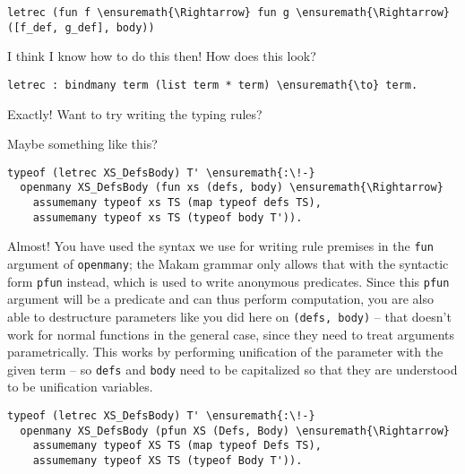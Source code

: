\begin{verbatim}
letrec (fun f \ensuremath{\Rightarrow} fun g \ensuremath{\Rightarrow} ([f_def, g_def], body))
\end{verbatim}

\heroSTUDENT{} I think I know how to do this then! How does this look?

\begin{verbatim}
letrec : bindmany term (list term * term) \ensuremath{\to} term.
\end{verbatim}

\heroADVISOR{} Exactly! Want to try writing the typing rules?

\heroSTUDENT{} Maybe something like this?

\begin{verbatim}
typeof (letrec XS_DefsBody) T' \ensuremath{:\!-}
  openmany XS_DefsBody (fun xs (defs, body) \ensuremath{\Rightarrow}
    assumemany typeof xs TS (map typeof defs TS),
    assumemany typeof xs TS (typeof body T')).
\end{verbatim}

\heroADVISOR{} Almost! You have used the syntax we use for writing rule
premises in the \texttt{fun} argument of \texttt{openmany}; the Makam
grammar only allows that with the syntactic form \texttt{pfun} instead,
which is used to write anonymous predicates. Since this \texttt{pfun}
argument will be a predicate and can thus perform computation, you are
also able to destructure parameters like you did here on
\texttt{(defs,\ body)} -- that doesn't work for normal functions in the
general case, since they need to treat arguments parametrically. This
works by performing unification of the parameter with the given term --
so \texttt{defs} and \texttt{body} need to be capitalized so that they
are understood to be unification variables.

\importantCodeblock{}

\begin{verbatim}
typeof (letrec XS_DefsBody) T' \ensuremath{:\!-}
  openmany XS_DefsBody (pfun XS (Defs, Body) \ensuremath{\Rightarrow}
    assumemany typeof XS TS (map typeof Defs TS),
    assumemany typeof XS TS (typeof Body T')).
\end{verbatim}

\importantCodeblockEnd{}

